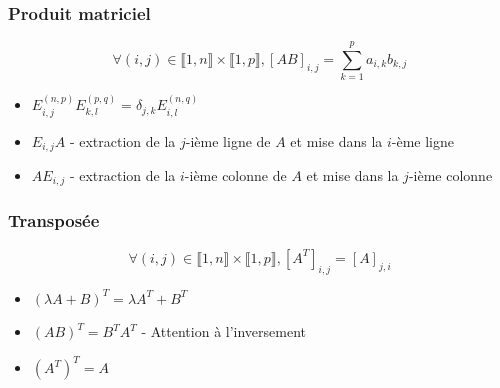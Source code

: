 \documentclass[openany]{book}
\begin{document}
\subsubsection{Produit matriciel}
\[ \forall (i, j) \in \llbracket 1, n \rrbracket \times \llbracket 1, p \rrbracket, [AB]_{i, j} = \sum_{k=1}^pa_{i, k}b_{k, j} \]

\begin{itemize}
    \item $ E_{i, j}^{(n, p)}E_{k, l}^{(p, q)} = \delta_{j, k}E_{i, l}^{(n, q)} $ 
    \item $ E_{i, j}A $ - extraction de la $j$-ième ligne de $A$ et mise dans la $i$-ème ligne
    \item $ AE_{i, j} $ - extraction de la $i$-ième colonne de $A$ et mise dans la $j$-ième colonne
\end{itemize}

\subsubsection{Transposée}
\[ \forall(i, j) \in \llbracket 1, n \rrbracket \times \llbracket 1, p \rrbracket, [A^T]_{i, j} = [A]_{j,i} \]

\begin{itemize}
    \item $ (\lambda A+B)^T = \lambda A^T + B^T $
    \item $ (AB)^T = B^TA^T $ - Attention à l'inversement
    \item $ (A^T)^T = A $
\end{itemize}
\end{document}
